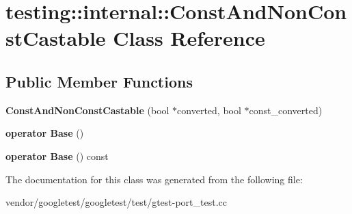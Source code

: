 \hypertarget{classtesting_1_1internal_1_1_const_and_non_const_castable}{}\section{testing\+:\+:internal\+:\+:Const\+And\+Non\+Const\+Castable Class Reference}
\label{classtesting_1_1internal_1_1_const_and_non_const_castable}
\subsection*{Public Member Functions}
\begin{DoxyCompactItemize}
\item 
\mbox{\label{classtesting_1_1internal_1_1_const_and_non_const_castable_aebe0ef6897b7f805e227bb969d4ee034}} 
{\bfseries Const\+And\+Non\+Const\+Castable} (bool $\ast$converted, bool $\ast$const\+\_\+converted)
\item 
\mbox{\label{classtesting_1_1internal_1_1_const_and_non_const_castable_aff0c372d429d76d002bb29f83f2429fa}} 
{\bfseries operator Base} ()
\item 
\mbox{\label{classtesting_1_1internal_1_1_const_and_non_const_castable_a4e8ee8051162f1dfc1da294c71481e2f}} 
{\bfseries operator Base} () const
\end{DoxyCompactItemize}


The documentation for this class was generated from the following file\+:\begin{DoxyCompactItemize}
\item 
vendor/googletest/googletest/test/gtest-\/port\+\_\+test.\+cc\end{DoxyCompactItemize}
